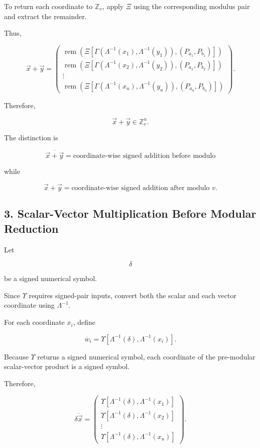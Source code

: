 \documentclass[12pt]{article}
\begin{document}
To return each coordinate to \(\mathbb Z_v\), apply \(\Xi\) using the corresponding modulus pair and extract the remainder.

Thus,

\[
\boxed{
\vec{x}+\vec{y}
=
\begin{pmatrix}
\operatorname{rem}
\left(
\Xi
\left[
\Gamma
\left(
\Lambda^{-1}(x_1),
\Lambda^{-1}(y_1)
\right),
(P_{a_1},P_{b_1})
\right]
\right)
\\[12pt]
\operatorname{rem}
\left(
\Xi
\left[
\Gamma
\left(
\Lambda^{-1}(x_2),
\Lambda^{-1}(y_2)
\right),
(P_{a_2},P_{b_2})
\right]
\right)
\\
\vdots
\\
\operatorname{rem}
\left(
\Xi
\left[
\Gamma
\left(
\Lambda^{-1}(x_u),
\Lambda^{-1}(y_u)
\right),
(P_{a_u},P_{b_u})
\right]
\right)
\end{pmatrix}.
}
\]

Therefore,

\[
\boxed{
\vec{x}+\vec{y}\in\mathbb Z_v^u.
}
\]

The distinction is

\[
\boxed{
\overline{\vec{x}+\vec{y}}
=
\text{coordinate-wise signed addition before modulo}
}
\]

while

\[
\boxed{
\vec{x}+\vec{y}
=
\text{coordinate-wise signed addition after modulo }v.
}
\]

\subsection*{3. Scalar-Vector Multiplication Before Modular Reduction}

Let

\[
\delta
\]

be a signed numerical symbol.

Since \(\Upsilon\) requires signed-pair inputs, convert both the scalar and each vector coordinate using \(\Lambda^{-1}\).

For each coordinate \(x_i\), define

\[
\boxed{
\overline{w}_i
=
\Upsilon
\left[
\Lambda^{-1}(\delta),
\Lambda^{-1}(x_i)
\right].
}
\]

Because \(\Upsilon\) returns a signed numerical symbol, each coordinate of the pre-modular scalar-vector product is a signed symbol.

Therefore,

\[
\boxed{
\overline{\delta\vec{x}}
=
\begin{pmatrix}
\Upsilon
\left[
\Lambda^{-1}(\delta),
\Lambda^{-1}(x_1)
\right]
\\[8pt]
\Upsilon
\left[
\Lambda^{-1}(\delta),
\Lambda^{-1}(x_2)
\right]
\\
\vdots
\\
\Upsilon
\left[
\Lambda^{-1}(\delta),
\Lambda^{-1}(x_u)
\right]
\end{pmatrix}.
}
\]
\end{document}

